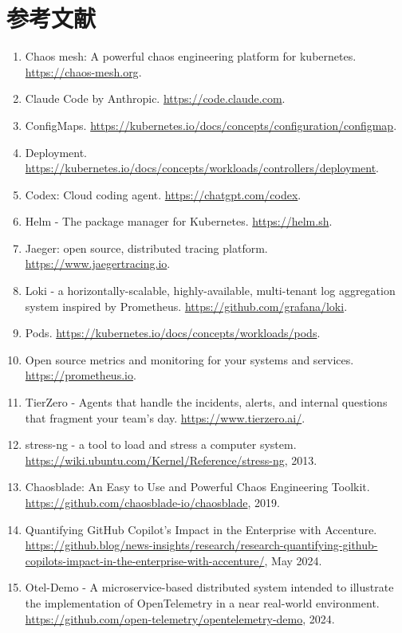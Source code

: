 \documentclass[11pt,UTF8,fontset=fandol]{ctexart}
\begin{document}
\section*{参考文献}
\begin{enumerate}[leftmargin=2.2em,labelsep=0.4em,itemsep=0.15em]
\item Chaos mesh: A powerful chaos engineering platform for kubernetes. \url{https://chaos-mesh.org}.
\item Claude Code by Anthropic. \url{https://code.claude.com}.
\item ConfigMaps. \url{https://kubernetes.io/docs/concepts/configuration/configmap}.
\item Deployment. \url{https://kubernetes.io/docs/concepts/workloads/controllers/deployment}.
\item Codex: Cloud coding agent. \url{https://chatgpt.com/codex}.
\item Helm - The package manager for Kubernetes. \url{https://helm.sh}.
\item Jaeger: open source, distributed tracing platform. \url{https://www.jaegertracing.io}.
\item Loki - a horizontally-scalable, highly-available, multi-tenant log aggregation system inspired by Prometheus. \url{https://github.com/grafana/loki}.
\item Pods. \url{https://kubernetes.io/docs/concepts/workloads/pods}.
\item Open source metrics and monitoring for your systems and services. \url{https://prometheus.io}.
\item TierZero - Agents that handle the incidents, alerts, and internal questions that fragment your team's day. \url{https://www.tierzero.ai/}.
\item stress-ng - a tool to load and stress a computer system. \url{https://wiki.ubuntu.com/Kernel/Reference/stress-ng}, 2013.
\item Chaosblade: An Easy to Use and Powerful Chaos Engineering Toolkit. \url{https://github.com/chaosblade-io/chaosblade}, 2019.
\item Quantifying GitHub Copilot's Impact in the Enterprise with Accenture. \url{https://github.blog/news-insights/research/research-quantifying-github-copilots-impact-in-the-enterprise-with-accenture/}, May 2024.
\item Otel-Demo - A microservice-based distributed system intended to illustrate the implementation of OpenTelemetry in a near real-world environment. \url{https://github.com/open-telemetry/opentelemetry-demo}, 2024.

\end{enumerate}
\end{document}
